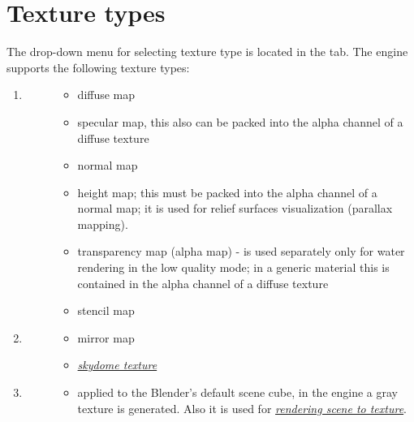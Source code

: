 \documentclass[a4paper,12pt,oneside]{sphinxmanual}
\begin{document}
\section{Texture types}
\label{textures:id2}\label{textures:index-1}
The drop-down menu  for selecting texture type is located in the  tab. The engine supports the following texture types:
\begin{enumerate}
\item {} \begin{description}
\item[{}] \leavevmode\begin{itemize}
\item {} 
diffuse map

\item {} 
specular map, this also can be packed into the alpha channel of a diffuse texture

\item {} 
normal map

\item {} 
height map; this must be packed into the alpha channel of a normal map; it is used for relief surfaces visualization (parallax mapping).

\item {} 
transparency map (alpha map) - is used separately only for water rendering in the low quality mode; in a generic material this is contained in the alpha channel of a diffuse texture

\item {} 
stencil map

\end{itemize}

\end{description}

\item {} \begin{description}
\item[{}] \leavevmode\begin{itemize}
\item {} 
mirror map

\item {} 
{\hyperref[textures:skydome-texture]{\emph{skydome texture}}}

\end{itemize}

\end{description}

\item {} \begin{description}
\item[{}] \leavevmode\begin{itemize}
\item {} 
applied to the Blender's default scene cube, in the engine a gray texture is generated. Also it is used for {\hyperref[textures:render-to-texture]{\emph{rendering scene to texture}}}.


\end{itemize}
\end{description}
\end{enumerate}
\end{document}
